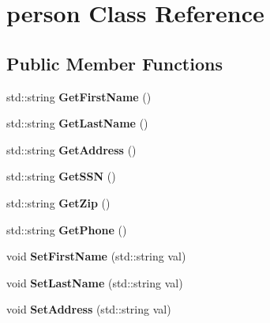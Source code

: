 \hypertarget{classperson}{\section{person Class Reference}
\label{d7/db3/classperson}
}
\subsection*{Public Member Functions}
\begin{DoxyCompactItemize}
\item 
\hypertarget{classperson_ae51e4db2f4062727dafa2360235a1af0}{std\-::string {\bfseries Get\-First\-Name} ()}\label{d7/db3/classperson_ae51e4db2f4062727dafa2360235a1af0}

\item 
\hypertarget{classperson_a4071fb0ed9c89dbdc28edbec0169d8a4}{std\-::string {\bfseries Get\-Last\-Name} ()}\label{d7/db3/classperson_a4071fb0ed9c89dbdc28edbec0169d8a4}

\item 
\hypertarget{classperson_a89f2b1d68585cf75f42342a16f90f807}{std\-::string {\bfseries Get\-Address} ()}\label{d7/db3/classperson_a89f2b1d68585cf75f42342a16f90f807}

\item 
\hypertarget{classperson_a31df9be3d36abb32526b5058f6053a21}{std\-::string {\bfseries Get\-S\-S\-N} ()}\label{d7/db3/classperson_a31df9be3d36abb32526b5058f6053a21}

\item 
\hypertarget{classperson_a51e27cd24d7767277a28c27c7b933eeb}{std\-::string {\bfseries Get\-Zip} ()}\label{d7/db3/classperson_a51e27cd24d7767277a28c27c7b933eeb}

\item 
\hypertarget{classperson_a2ba50f2ea2725ac0819f245426bec37f}{std\-::string {\bfseries Get\-Phone} ()}\label{d7/db3/classperson_a2ba50f2ea2725ac0819f245426bec37f}

\item 
\hypertarget{classperson_a95073ba3711f5152accbc1e055ebcd92}{void {\bfseries Set\-First\-Name} (std\-::string val)}\label{d7/db3/classperson_a95073ba3711f5152accbc1e055ebcd92}

\item 
\hypertarget{classperson_af4a18f7bd8fc7d4a480b47332634d2c4}{void {\bfseries Set\-Last\-Name} (std\-::string val)}\label{d7/db3/classperson_af4a18f7bd8fc7d4a480b47332634d2c4}

\item 
\hypertarget{classperson_a8b9a2ba042f86f3fe1c20c900c3585ac}{void {\bfseries Set\-Address} (std\-::string val)}\label{d7/db3/classperson_a8b9a2ba042f86f3fe1c20c900c3585ac}


\end{DoxyCompactItemize}
